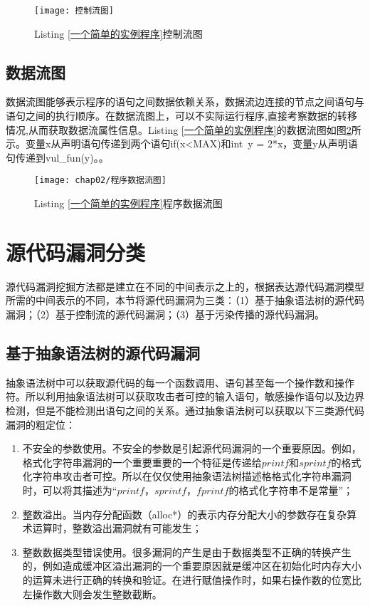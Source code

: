 \begin{figure}[htp]
\centering
\texttt{[image: 控制流图]}
\caption{Listing \ref{一个简单的实例程序}控制流图}
\label{控制流图}
\end{figure}

\subsection{数据流图}

数据流图能够表示程序的语句之间数据依赖关系，数据流边连接的节点之间语句与语句之间的执行顺序。在数据流图上，可以不实际运行程序,直接考察数据的转移情况,从而获取数据流属性信息。Listing \ref{一个简单的实例程序}的数据流图如图\ref{程序数据流图}所示。变量x从声明语句传递到两个语句if(x<MAX)和int\ y = 2*x，变量y从声明语句传递到vul\_fun(y)。。

\begin{figure}[htp]
\centering
\texttt{[image: chap02/程序数据流图]}
\caption{Listing \ref{一个简单的实例程序}程序数据流图}
\label{程序数据流图}
\end{figure}

\section{源代码漏洞分类}

源代码漏洞挖掘方法都是建立在不同的中间表示之上的，根据表达源代码漏洞模型所需的中间表示的不同，本节将源代码漏洞为三类：（1）基于抽象语法树的源代码漏洞；（2）基于控制流的源代码漏洞；（3）基于污染传播的源代码漏洞。

\subsection{基于抽象语法树的源代码漏洞}

抽象语法树中可以获取源代码的每一个函数调用、语句甚至每一个操作数和操作符。所以利用抽象语法树可以获取攻击者可控的输入语句，敏感操作语句以及边界检测，但是不能检测出语句之间的关系。通过抽象语法树可以获取以下三类源代码漏洞的粗定位：

\begin{enumerate}[(1)]
\item 不安全的参数使用。不安全的参数是引起源代码漏洞的一个重要原因。例如，格式化字符串漏洞的一个重要重要的一个特征是传递给$printf$和$sprintf$的格式化字符串攻击者可控。所以在仅仅使用抽象语法树描述格格式化字符串漏洞时，可以将其描述为“$printf$，$sprintf$，$fprintf$的格式化字符串不是常量”；
\item 整数溢出。当内存分配函数（alloc*）的表示内存分配大小的参数存在复杂算术运算时，整数溢出漏洞就有可能发生；
\item 整数数据类型错误使用。很多漏洞的产生是由于数据类型不正确的转换产生的，例如造成缓冲区溢出漏洞的一个重要原因就是缓冲区在初始化时内存大小的运算未进行正确的转换和验证。在进行赋值操作时，如果右操作数的位宽比左操作数大则会发生整数截断。
\end{enumerate}


